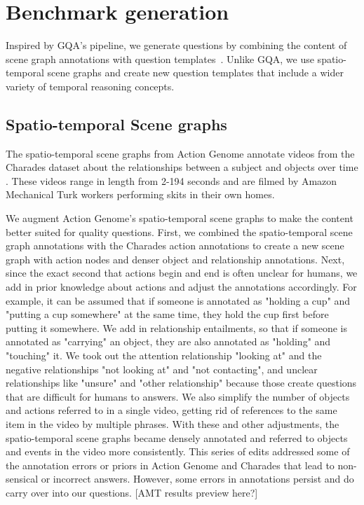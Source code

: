 
\section{Benchmark generation}

Inspired by GQA's pipeline, we generate questions by combining the content of scene graph annotations with question templates~\cite{hudson2019gqa}. Unlike GQA, we use spatio-temporal scene graphs and create new question templates that include a wider variety of temporal reasoning concepts. 

\subsection{Spatio-temporal Scene graphs}

The spatio-temporal scene graphs from Action Genome annotate videos from the Charades dataset about the relationships between a subject and objects over time \cite{ji2020action, sigurdsson2016hollywood}. These videos range in length from 2-194 seconds and are filmed by Amazon Mechanical Turk workers performing skits in their own homes.

We augment Action Genome's spatio-temporal scene graphs to make the content better suited for quality questions. First, we combined the spatio-temporal scene graph annotations with the Charades action annotations to create a new scene graph with action nodes and denser object and relationship annotations. Next, since the exact second that actions begin and end is often unclear for humans, we add in prior knowledge about actions and adjust the annotations accordingly. For example, it can be assumed that if someone is annotated as "holding a cup" and "putting a cup somewhere" at the same time, they hold the cup first before putting it somewhere. We add in relationship entailments, so that if someone is annotated as "carrying" an object, they are also annotated as "holding" and "touching" it. We took out the attention relationship "looking at" and the negative relationships "not looking at" and "not contacting", and unclear relationships like "unsure" and "other relationship" because those create questions that are difficult for humans to answers. We also simplify the number of objects and actions referred to in a single video, getting rid of references to the same item in the video by multiple phrases. With these and other adjustments, the spatio-temporal scene graphs became densely annotated and referred to objects and events in the video more consistently. This series of edits addressed some of the annotation errors or priors in Action Genome and Charades that lead to non-sensical or incorrect answers. However, some errors in annotations persist and do carry over into our questions. [AMT results preview here?]

